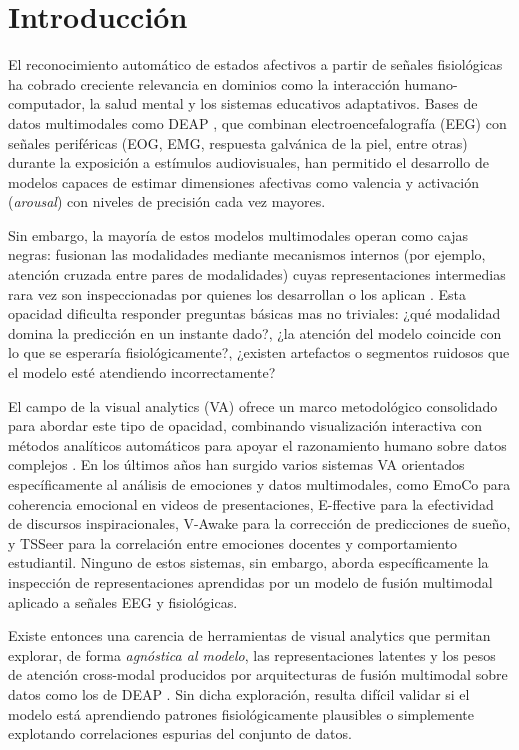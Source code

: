 \section{Introducción}\label{sec:intro}

El reconocimiento automático de estados afectivos a partir de señales fisiológicas ha cobrado creciente relevancia en dominios como la interacción humano-computador, la salud mental y los sistemas educativos adaptativos. Bases de datos multimodales como DEAP \cite{koelstra2012deap}, que combinan electroencefalografía (EEG) con señales periféricas (EOG, EMG, respuesta galvánica de la piel, entre otras) durante la exposición a estímulos audiovisuales, han permitido el desarrollo de modelos capaces de estimar dimensiones afectivas como valencia y activación (\emph{arousal}) con niveles de precisión cada vez mayores.

Sin embargo, la mayoría de estos modelos multimodales operan como cajas negras: fusionan las modalidades mediante mecanismos internos (por ejemplo, atención cruzada entre pares de modalidades) cuyas representaciones intermedias rara vez son inspeccionadas por quienes los desarrollan o los aplican \cite{baltrusaitis2019multimodal}. Esta opacidad dificulta responder preguntas básicas mas no triviales: ¿qué modalidad domina la predicción en un instante dado?, ¿la atención del modelo coincide con lo que se esperaría fisiológicamente?, ¿existen artefactos o segmentos ruidosos que el modelo esté atendiendo incorrectamente?

El campo de la visual analytics (VA) ofrece un marco metodológico consolidado para abordar este tipo de opacidad, combinando visualización interactiva con métodos analíticos automáticos para apoyar el razonamiento humano sobre datos complejos \cite{keim2008visual}. En los últimos años han surgido varios sistemas VA orientados específicamente al análisis de emociones y datos multimodales, como EmoCo \cite{Emoco2019} para coherencia emocional en videos de presentaciones, E-ffective \cite{maher2022effective} para la efectividad de discursos inspiracionales, V-Awake \cite{garcia2019vawake} para la corrección de predicciones de sueño, y TSSeer \cite{kui2024tsseer} para la correlación entre emociones docentes y comportamiento estudiantil. Ninguno de estos sistemas, sin embargo, aborda específicamente la inspección de representaciones aprendidas por un modelo de fusión multimodal aplicado a señales EEG y fisiológicas.

Existe entonces una carencia de herramientas de visual analytics que permitan explorar, de forma \emph{agnóstica al modelo}, las representaciones latentes y los pesos de atención cross-modal producidos por arquitecturas de fusión multimodal sobre datos como los de DEAP \cite{koelstra2012deap}. Sin dicha exploración, resulta difícil validar si el modelo está aprendiendo patrones fisiológicamente plausibles o simplemente explotando correlaciones espurias del conjunto de datos.

